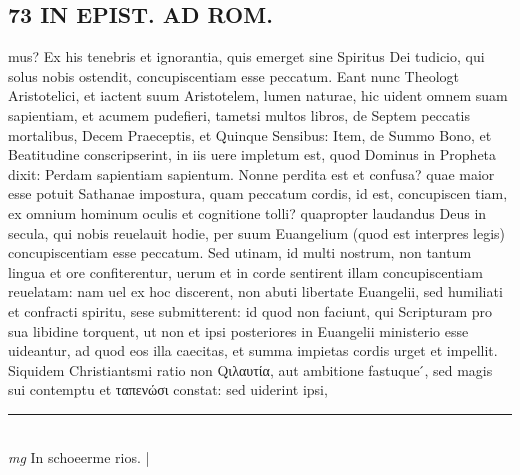 \documentclass{article}
\begin{document}
\begin{pages}
\section*{73 IN EPIST. AD ROM.  }
\marginpar{[ p.]}\pstart mus? Ex his tenebris et ignorantia, quis emerget sine Spiritus Dei tudicio, qui solus nobis ostendit, concupiscentiam esse peccatum. Eant nunc Theologt Aristotelici, et iactent suum Aristotelem, lumen naturae, hic uident omnem suam sapientiam, et acumem pudefieri, tametsi multos libros, de Septem peccatis mortalibus, Decem Praeceptis, et Quinque Sensibus: Item, de Summo Bono, et Beatitudine conscripserint, in iis uere impletum est, quod Dominus in Propheta dixit: Perdam sapientiam sapientum. Nonne perdita est et confusa? quae maior esse potuit Sathanae impostura, quam peccatum cordis, id est, concupiscen tiam, ex omnium hominum oculis et cognitione tolli? quapropter laudandus Deus in secula, qui nobis reuelauit hodie, per suum Euangelium (quod est interpres legis) concupiscentiam esse peccatum. Sed utinam, id multi nostrum, non tantum lingua et ore confiterentur, uerum et in corde sentirent illam concupiscentiam reuelatam: nam uel ex hoc discerent, non abuti libertate Euangelii, sed humiliati et confracti spiritu, sese submitterent: id quod non faciunt, qui Scripturam pro sua libidine torquent, ut non et ipsi posteriores in Euangelii ministerio esse uideantur, ad quod eos illa caecitas, et summa impietas cordis urget et impellit. Siquidem Christiantsmi ratio non Qιλαυτία, aut ambitione fastuque ́, sed magis sui contemptu et ταπενώσι constat: sed uiderint ipsi,  \pend
\vspace{0.5cm}\noindent
\vspace{0.2cm}\rule{1cm}{0.2pt}\\ 
\hspace{0.2cm}\textit{mg}
\footnotesize In schoeerme rios.  
\normalsize| 

\end{pages}
\end{document}
